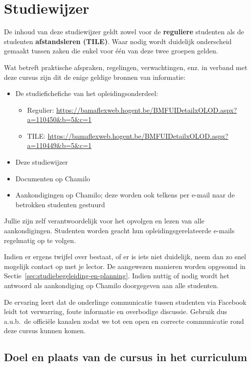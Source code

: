 \chapter{Studiewijzer}
\label{ch:studiewijzer}

De inhoud van deze studiewijzer geldt zowel voor de \textbf{reguliere} studenten als de studenten \textbf{afstandsleren (TILE)}. Waar nodig wordt duidelijk onderscheid gemaakt tussen zaken die enkel voor één van deze twee groepen gelden.

Wat betreft praktische afspraken, regelingen, verwachtingen, enz. in
verband met deze cursus zijn dit de enige geldige bronnen van
informatie:

\begin{itemize}
  \item De studiefichefiche van het opleidingsonderdeel:
  \begin{itemize}
    \item Regulier: \url{https://bamaflexweb.hogent.be/BMFUIDetailxOLOD.aspx?a=110450\&b=5\&c=1}
    \item TILE: \url{https://bamaflexweb.hogent.be/BMFUIDetailxOLOD.aspx?a=110449\&b=5\&c=1}
  \end{itemize}
  \item Deze studiewijzer
  \item Documenten op Chamilo
  \item Aankondigingen op Chamilo; deze worden ook telkens per e-mail naar de betrokken studenten gestuurd
\end{itemize}

Jullie zijn zelf verantwoordelijk voor het opvolgen en lezen van alle aankondigingen. Studenten worden geacht hun opleidingsgerelateerde e-mails regelmatig op te volgen.

Indien er ergens twijfel over bestaat, of er is iets niet duidelijk, neem dan zo snel mogelijk contact op met je lector. De aangewezen manieren worden opgesomd in Sectie~\ref{sec:studiebegeleiding-en-planning}. Indien nuttig of nodig wordt het antwoord als aankondiging op Chamilo doorgegeven aan alle studenten.

De ervaring leert dat de onderlinge communicatie tussen studenten via Facebook leidt tot verwarring, foute informatie en overbodige discussie. Gebruik dus a.u.b.~de officiële kanalen zodat we tot een open en correcte communicatie rond deze cursus kunnen komen.



\section{Doel en plaats van de cursus in het curriculum}
\label{sec:doel-en-plaats}


